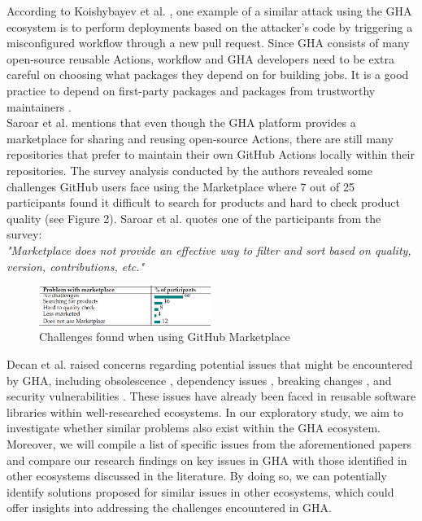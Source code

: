 \documentclass[conference]{IEEEtran}
\begin{document}
        According to Koishybayev et al. \cite{koishybayev2022characterizing}, one example of a similar attack using the GHA ecosystem is to perform deployments based on the attacker’s code by triggering a misconfigured workflow through a new pull request. Since GHA consists of many open-source reusable Actions, workflow and GHA developers need to be extra careful on choosing what packages they depend on for building jobs. It is a good practice to depend on first-party packages and packages from trustworthy maintainers \cite{zimmermann2019small}. \\

        Saroar et al. \cite{saroar2023developers} mentions that even though the GHA platform provides a marketplace for sharing and reusing open-source Actions, there are still many repositories that prefer to maintain their own GitHub Actions locally within their repositories. The survey analysis conducted by the authors revealed some challenges GitHub users face using the Marketplace where 7 out of 25 participants found it difficult to search for products and hard to check product quality (see Figure 2). Saroar et al. \cite{saroar2023developers} quotes one of the participants from the survey: \\

\textit{"Marketplace does not provide an effective way to filter and sort based on quality, version, contributions, etc."}\\

\begin{figure} [h]
\includegraphics[width=0.5\textwidth]{Table 1.png}
\caption{Challenges found when using GitHub Marketplace \cite{saroar2023developers} }
\end{figure}

	Decan et al. \cite{decan2022use} raised concerns regarding potential issues that might be encountered by GHA, including obsolescence \cite{decan2018evolution} \cite{cogo2021deprecation}, dependency issues \cite{decan2019empirical} \cite{soto2021comprehensive} \cite{decan2019package}, breaking changes \cite{dietrich2019dependency} \cite{decan2018impact}, and security vulnerabilities \cite{zimmermann2019small} \cite{kula2018developers}. These issues have already been faced in reusable software libraries within well-researched ecosystems. In our exploratory study, we aim to investigate whether similar problems also exist within the GHA ecosystem. Moreover, we will compile a list of specific issues from the aforementioned papers and compare our research findings on key issues in GHA with those identified in other ecosystems discussed in the literature. By doing so, we can potentially identify solutions proposed for similar issues in other ecosystems, which could offer insights into addressing the challenges encountered in GHA.\\
\end{document}
